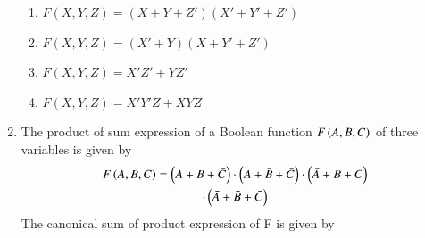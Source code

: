 \begin{enumerate}[label=\arabic*.,ref=\theenumi]
\begin{enumerate}
    \item $F(X, Y, Z) = (X + Y + Z') (X' + Y' + Z')$
    \item $F(X, Y, Z) = (X'+ Y) (X + Y' + Z')$
    \item $F(X, Y, Z) = X'Z' + YZ'$
    \item $F(X, Y, Z) = X'Y'Z + XYZ$
\end{enumerate}

\item The product of sum expression of a Boolean function $F\left(A,B,C\right)$ of three variables is given by
\begin{multline}
F\left(A,B,C\right) = \left(A + B + \bar{C}\right)\cdot\left(A + \bar{B} +\bar{C}\right)\cdot\left(\bar{A} + B + C\right)
	\\
	\cdot\left(\bar{A} + \bar{B} + \bar{C}\right)
\end{multline}
The canonical sum of product expression of F is  given by

\end{enumerate}
